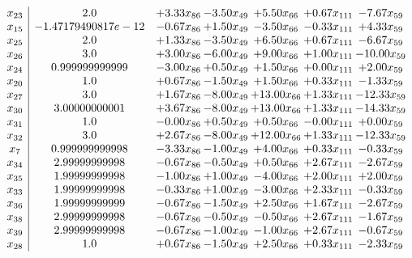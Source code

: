 \documentclass[8pt]{article}
\begin{document}
\[\begin{array}{c| c c@{\hskip 2pt} c@{\hskip 2pt} c@{\hskip 2pt} c@{\hskip 2pt} c@{\hskip 2pt} }
 x_{23}   &  2.0 & +  3.33 x_{86} & -3.50 x_{49} & +  5.50 x_{66} & +  0.67 x_{111} & -7.67 x_{59}\\
 x_{15}   &  -1.47179490817e-12 & -0.67 x_{86} & +  1.50 x_{49} & -3.50 x_{66} & -0.33 x_{111} & +  4.33 x_{59}\\
 x_{25}   &  2.0 & +  1.33 x_{86} & -3.50 x_{49} & +  6.50 x_{66} & +  0.67 x_{111} & -6.67 x_{59}\\
 x_{26}   &  3.0 & +  3.00 x_{86} & -6.00 x_{49} & +  9.00 x_{66} & +  1.00 x_{111} & -10.00 x_{59}\\
 x_{24}   &  0.999999999999 & -3.00 x_{86} & +  0.50 x_{49} & +  1.50 x_{66} & +  0.00 x_{111} & +  2.00 x_{59}\\
 x_{20}   &  1.0 & +  0.67 x_{86} & -1.50 x_{49} & +  1.50 x_{66} & +  0.33 x_{111} & -1.33 x_{59}\\
 x_{27}   &  3.0 & +  1.67 x_{86} & -8.00 x_{49} & + 13.00 x_{66} & +  1.33 x_{111} & -12.33 x_{59}\\
 x_{30}   &  3.00000000001 & +  3.67 x_{86} & -8.00 x_{49} & + 13.00 x_{66} & +  1.33 x_{111} & -14.33 x_{59}\\
 x_{31}   &  1.0 & -0.00 x_{86} & +  0.50 x_{49} & +  0.50 x_{66} & -0.00 x_{111} & +  0.00 x_{59}\\
 x_{32}   &  3.0 & +  2.67 x_{86} & -8.00 x_{49} & + 12.00 x_{66} & +  1.33 x_{111} & -12.33 x_{59}\\
 x_{7}   &  0.999999999998 & -3.33 x_{86} & -1.00 x_{49} & +  4.00 x_{66} & +  0.33 x_{111} & -0.33 x_{59}\\
 x_{34}   &  2.99999999998 & -0.67 x_{86} & -0.50 x_{49} & +  0.50 x_{66} & +  2.67 x_{111} & -2.67 x_{59}\\
 x_{35}   &  1.99999999998 & -1.00 x_{86} & +  1.00 x_{49} & -4.00 x_{66} & +  2.00 x_{111} & +  2.00 x_{59}\\
 x_{33}   &  1.99999999998 & -0.33 x_{86} & +  1.00 x_{49} & -3.00 x_{66} & +  2.33 x_{111} & -0.33 x_{59}\\
 x_{36}   &  1.99999999999 & -0.67 x_{86} & -1.50 x_{49} & +  2.50 x_{66} & +  1.67 x_{111} & -2.67 x_{59}\\
 x_{38}   &  2.99999999998 & -0.67 x_{86} & -0.50 x_{49} & -0.50 x_{66} & +  2.67 x_{111} & -1.67 x_{59}\\
 x_{39}   &  2.99999999998 & -0.67 x_{86} & -1.00 x_{49} & -1.00 x_{66} & +  2.67 x_{111} & -0.67 x_{59}\\
 x_{28}   &  1.0 & +  0.67 x_{86} & -1.50 x_{49} & +  2.50 x_{66} & +  0.33 x_{111} & -2.33 x_{59}\\

\end{array}\]
\end{document}
